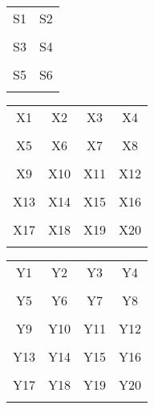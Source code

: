 \documentclass[12pt]{article}
\begin{document}
\begin{tabular}{cc}
\hline
S1 & S2 \\
 &  \\
\hline
S3 & S4 \\
 &  \\
\hline
S5 & S6 \\
 & \\
\end{tabular}
\pagebreak

\begin{tabular}{cccc}
\hline
X1 & X2 & X3 & X4 \\
 &  &  & \\
\hline
X5 & X6 & X7 & X8 \\
 &  &  & \\
\hline
X9 & X10 & X11 & X12 \\
 &  &  & \\
\hline
X13 & X14 & X15 & X16 \\
 &  &  & \\
\hline
X17 & X18 & X19 & X20 \\
 &  &  & \\
\end{tabular}
\newpage

\begin{tabular}{cccc}
\hline
Y1 & Y2 & Y3 & Y4 \\
 &  &  & \\
\hline
Y5 & Y6 & Y7 & Y8 \\
 &  &  & \\
\hline
Y9 & Y10 & Y11 & Y12 \\
 &  &  & \\
\hline
Y13 & Y14 & Y15 & Y16 \\
 &  &  & \\
\hline
Y17 & Y18 & Y19 & Y20 \\
 &  &  & \\
\end{tabular}
\newpage
\end{document}
